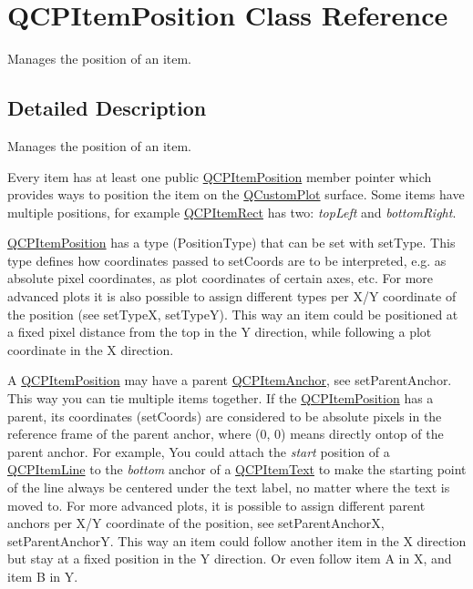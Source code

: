 \hypertarget{class_q_c_p_item_position}{}\section{Q\+C\+P\+Item\+Position Class Reference}
\label{class_q_c_p_item_position}


Manages the position of an item.  




\subsection{Detailed Description}
Manages the position of an item. 

Every item has at least one public \mbox{\hyperlink{class_q_c_p_item_position}{Q\+C\+P\+Item\+Position}} member pointer which provides ways to position the item on the \mbox{\hyperlink{class_q_custom_plot}{Q\+Custom\+Plot}} surface. Some items have multiple positions, for example \mbox{\hyperlink{class_q_c_p_item_rect}{Q\+C\+P\+Item\+Rect}} has two\+: {\itshape top\+Left} and {\itshape bottom\+Right}.

\mbox{\hyperlink{class_q_c_p_item_position}{Q\+C\+P\+Item\+Position}} has a type (Position\+Type) that can be set with set\+Type. This type defines how coordinates passed to set\+Coords are to be interpreted, e.\+g. as absolute pixel coordinates, as plot coordinates of certain axes, etc. For more advanced plots it is also possible to assign different types per X/Y coordinate of the position (see set\+TypeX, set\+TypeY). This way an item could be positioned at a fixed pixel distance from the top in the Y direction, while following a plot coordinate in the X direction.

A \mbox{\hyperlink{class_q_c_p_item_position}{Q\+C\+P\+Item\+Position}} may have a parent \mbox{\hyperlink{class_q_c_p_item_anchor}{Q\+C\+P\+Item\+Anchor}}, see set\+Parent\+Anchor. This way you can tie multiple items together. If the \mbox{\hyperlink{class_q_c_p_item_position}{Q\+C\+P\+Item\+Position}} has a parent, its coordinates (set\+Coords) are considered to be absolute pixels in the reference frame of the parent anchor, where (0, 0) means directly ontop of the parent anchor. For example, You could attach the {\itshape start} position of a \mbox{\hyperlink{class_q_c_p_item_line}{Q\+C\+P\+Item\+Line}} to the {\itshape bottom} anchor of a \mbox{\hyperlink{class_q_c_p_item_text}{Q\+C\+P\+Item\+Text}} to make the starting point of the line always be centered under the text label, no matter where the text is moved to. For more advanced plots, it is possible to assign different parent anchors per X/Y coordinate of the position, see set\+Parent\+AnchorX, set\+Parent\+AnchorY. This way an item could follow another item in the X direction but stay at a fixed position in the Y direction. Or even follow item A in X, and item B in Y.

